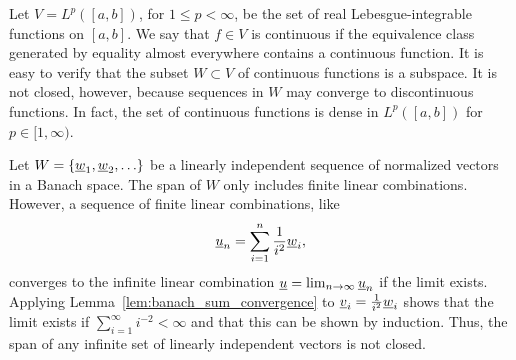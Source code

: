 \begin{example}
Let $V = L^p ( [a,b] )$, for $1\leq p <\infty$, be the set of real Lebesgue-integrable functions on $[a,b]$.
We say that $f \in V$ is continuous if the equivalence class generated by equality almost everywhere contains a continuous function.
It is easy to verify that the subset $W \subset V$ of continuous functions is a subspace.
It is not closed, however, because sequences in $W$ may converge to discontinuous functions.
In fact,  the set of continuous functions is dense in $L^p ([a,b])$ for $p\in[1,\infty)$. %
\end{example}
\begin{example}
Let $W = \{\underline{w}_1 ,\underline{w}_2 , \ldots \}$ be a linearly independent sequence of normalized vectors in a Banach space.
The span of $W$ only includes finite linear combinations.
However, a sequence of finite linear combinations, like 
\[ \underline{u}_n = \sum_{i=1}^n \frac{1}{i^2} \underline{w}_i , \]  converges to the infinite linear combination $\underline{u} = \lim_{n\to \infty} \underline{u}_n$ if the limit exists.
Applying Lemma~\ref{lem:banach_sum_convergence} to $\underline{v}_i = \frac{1}{i^2} \underline{w}_i$ shows that the limit exists if $\sum_{i=1}^\infty i^{-2} < \infty$ and that this can be shown by induction.
Thus, the span of any infinite set of linearly independent vectors is not closed.
\end{example}

